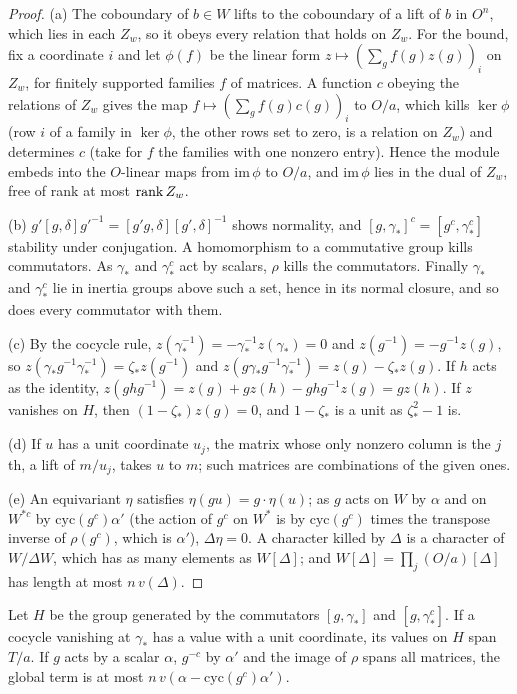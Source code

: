 \begin{proof}
(a) The coboundary of $b\in W$ lifts to the coboundary of a lift of $b$ in $O^n$, which lies in each $Z_w$, so it obeys every relation that holds on $Z_w$. For the bound, fix a coordinate $i$ and let $\phi(f)$ be the linear form $z\mapsto(\sum_gf(g)z(g))_i$ on $Z_w$, for finitely supported families $f$ of matrices. A function $c$ obeying the relations of $Z_w$ gives the map $f\mapsto(\sum_gf(g)c(g))_i$ to $O/a$, which kills $\ker\phi$ (row $i$ of a family in $\ker\phi$, the other
rows set to zero, is a relation on $Z_w$) and determines $c$ (take for $f$ the families with one nonzero entry). Hence the module embeds into the $O$-linear maps from $\mathrm{im}\,\phi$ to $O/a$, and $\mathrm{im}\,\phi$ lies in the dual of $Z_w$, free of rank at most $\operatorname{rank} Z_w$.

(b) $g'[g,\delta]g'^{-1}=[g'g,\delta][g',\delta]^{-1}$ shows normality, and $[g,\gamma_*]^c=[g^c,\gamma_*^c]$ stability under conjugation. A homomorphism to a commutative group kills commutators. As $\gamma_*$ and $\gamma_*^c$ act by scalars, $\rho$ kills the commutators. Finally $\gamma_*$ and $\gamma_*^c$ lie in inertia groups above
such a set, hence in its normal closure, and so does every commutator with them.

(c) By the cocycle rule, $z(\gamma_*^{-1})=-\gamma_*^{-1}z(\gamma_*)=0$ and $z(g^{-1})=-g^{-1}z(g)$, so $z(\gamma_*g^{-1}\gamma_*^{-1})=\zeta_*z(g^{-1})$ and $z(g\gamma_*g^{-1}\gamma_*^{-1})=z(g)-\zeta_*z(g)$. If $h$ acts as the identity, $z(ghg^{-1})=z(g)+gz(h)-ghg^{-1}z(g)=gz(h)$. If $z$ vanishes on $H$, then $(1-\zeta_*)z(g)=0$, and $1-\zeta_*$ is a unit as
$\zeta_*^2-1$ is.

(d) If $u$ has a unit coordinate $u_j$, the matrix whose only nonzero column is the $j$th, a lift of $m/u_j$, takes $u$ to $m$; such matrices are combinations of the given ones.

(e) An equivariant $\eta$ satisfies $\eta(gu)=g\cdot\eta(u)$; as $g$ acts on $W$ by $\alpha$ and on $W^{*c}$ by $\mathrm{cyc}(g^c)\alpha'$ (the action of $g^c$ on $W^*$ is by $\mathrm{cyc}(g^c)$ times the transpose inverse of $\rho(g^c)$, which is $\alpha'$), $\Delta\eta=0$. A character killed by $\Delta$ is a character of $W/\Delta W$, which has as many elements as
$W[\Delta]$; and $W[\Delta]=\prod_j(O/a)[\Delta]$ has length at most $n\,v(\Delta)$.
\end{proof}

\begin{lemma}[Sah]\label{lem:sah}
Let $H$ be the group generated by the commutators $[g,\gamma_*]$ and $[g,\gamma_*^c]$. If a cocycle vanishing at $\gamma_*$ has a value with a unit coordinate, its values on $H$ span $T/a$. If $g$ acts by a scalar $\alpha$, $g^{-c}$ by $\alpha'$ and the image of
$\rho$ spans all matrices, the global term is at most $n\,v(\alpha-\mathrm{cyc}(g^c)\alpha')$.
\end{lemma}

